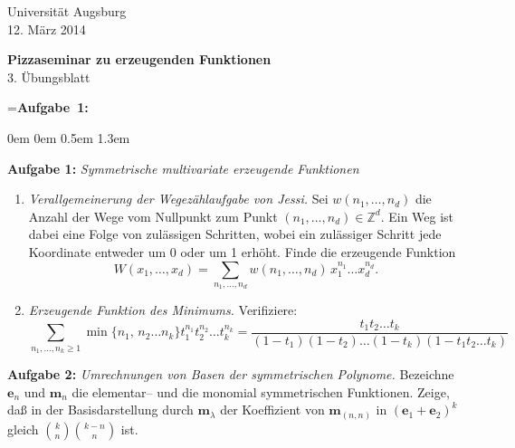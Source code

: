 \documentclass[a4paper,ngerman]{scrartcl}
\theoremstyle{definition}
\theoremstyle{plain}
\theoremstyle{remark}
\begin{document}
\vspace*{-4em}
\begin{flushright}Universität Augsburg \\ 12. März 2014\end{flushright}

\begin{center}\Large \textbf{Pizzaseminar zu erzeugenden Funktionen} \\
3. Übungsblatt
\end{center}
\vspace{1.5em}

\newbox{\mybox}
\setbox\mybox=\hbox{\textbf{Aufgabe 1:}}

\begin{list}{}{0em \leftmargin0em \itemindent0.5em \itemsep 1.3em}
\item[\textbf{Aufgabe 1:}] \emph{Symmetrische multivariate erzeugende Funktionen}
\begin{enumerate} 
\item \emph{Verallgemeinerung der Wegezählaufgabe von Jessi.} \newline
Sei $w(n_1,\ldots,n_d)$ die Anzahl der Wege vom Nullpunkt zum Punkt $(n_1,\ldots,n_d)\in\mathbb{Z}^d$. Ein Weg ist dabei eine Folge von zulässigen Schritten, wobei ein zulässiger Schritt jede Koordinate entweder um 0 oder um 1 erhöht. Finde die erzeugende Funktion
$$W(x_1,\ldots,x_d) = \sum_{n_1,\ldots,n_d} w(n_1,\ldots,n_d)\,x^{n_1}_1\ldots x^{n_d}_d .$$

\item \emph{Erzeugende Funktion des Minimums.} Verifiziere:
$$\sum_{n_1,\ldots,n_k\geq 1} \min\{n_1,\,n_2\ldots n_k\} t_1^{n_1}t_2^{n_2}\ldots t_k^{n_k} = 
\frac{t_1t_2\ldots t_k}{(1-t_1)(1-t_2)\ldots(1-t_k)(1-t_1t_2\ldots t_k)} $$
\end{enumerate}
\item[\textbf{Aufgabe 2:}] \emph{Umrechnungen von Basen der symmetrischen Polynome.} Bezeichne $\mathbf{e}_n$ und $\mathbf{m}_n$ die elementar-- und die monomial symmetrischen Funktionen. Zeige, daß in der Basisdarstellung durch $\mathbf{m}_\lambda$ der Koeffizient von $\mathbf{m}_{(n,n)}$ in $(\mathbf{e}_1+\mathbf{e}_2)^k$ gleich $\binom{k}{n}\binom{k-n}{n}$ ist.


\end{list}
\end{document}
